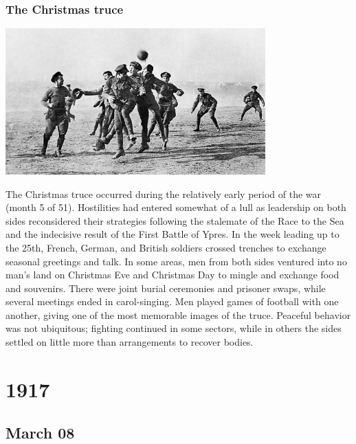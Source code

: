 \documentclass[11pt]{report}
\begin{document}
\subsection{The Christmas truce}
\vspace{2mm}\begin{center}\includegraphics[width=10cm]{./img/christmasTruce.jpg}\end{center}
The Christmas truce occurred during the relatively early period of the war (month 5 of 51). Hostilities had entered somewhat of a lull as leadership on both sides reconsidered their strategies following the stalemate of the Race to the Sea and the indecisive result of the First Battle of Ypres. In the week leading up to the 25th, French, German, and British soldiers crossed trenches to exchange seasonal greetings and talk. In some areas, men from both sides ventured into no man's land on Christmas Eve and Christmas Day to mingle and exchange food and souvenirs. There were joint burial ceremonies and prisoner swaps, while several meetings ended in carol-singing. Men played games of football with one another, giving one of the most memorable images of the truce. Peaceful behavior was not ubiquitous; fighting continued in some sectors, while in others the sides settled on little more than arrangements to recover bodies.

\chapter{1917}
\section{March 08}
\end{document}
